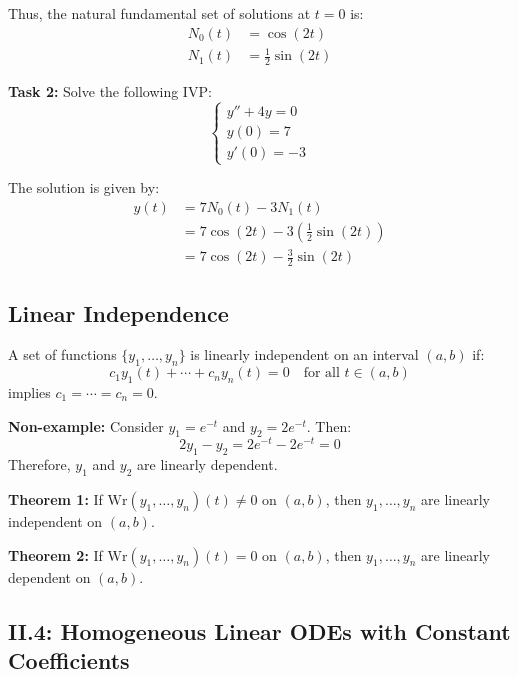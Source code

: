 \documentclass{article}
\begin{document}
Thus, the natural fundamental set of solutions at $t=0$ is:
\begin{align*}
N_0(t) &= \cos(2t) \\
N_1(t) &= \frac{1}{2}\sin(2t)
\end{align*}

\textbf{Task 2:} Solve the following IVP:
\begin{equation*}
\begin{cases}
y''+4y = 0 \\
y(0) = 7 \\
y'(0) = -3
\end{cases}
\end{equation*}

The solution is given by:
\begin{align*}
y(t) &= 7N_0(t) - 3N_1(t) \\
&= 7\cos(2t) - 3\left(\frac{1}{2}\sin(2t)\right) \\
&= 7\cos(2t) - \frac{3}{2}\sin(2t)
\end{align*}

\subsection*{Linear Independence}

A set of functions $\{y_1, \ldots, y_n\}$ is linearly independent on an interval $(a,b)$ if:
\begin{equation*}
c_1y_1(t) + \cdots + c_ny_n(t) = 0 \quad \text{for all } t \in (a,b)
\end{equation*}
implies $c_1 = \cdots = c_n = 0$.

\textbf{Non-example:} Consider $y_1 = e^{-t}$ and $y_2 = 2e^{-t}$. Then:
\begin{equation*}
2y_1 - y_2 = 2e^{-t} - 2e^{-t} = 0
\end{equation*}
Therefore, $y_1$ and $y_2$ are linearly dependent.

\textbf{Theorem 1:} If $\text{Wr}(y_1, \ldots, y_n)(t) \neq 0$ on $(a,b)$, then $y_1, \ldots, y_n$ are linearly independent on $(a,b)$.

\textbf{Theorem 2:} If $\text{Wr}(y_1, \ldots, y_n)(t) = 0$ on $(a,b)$, then $y_1, \ldots, y_n$ are linearly dependent on $(a,b)$.

\subsection*{II.4: Homogeneous Linear ODEs with Constant Coefficients}
\end{document}

